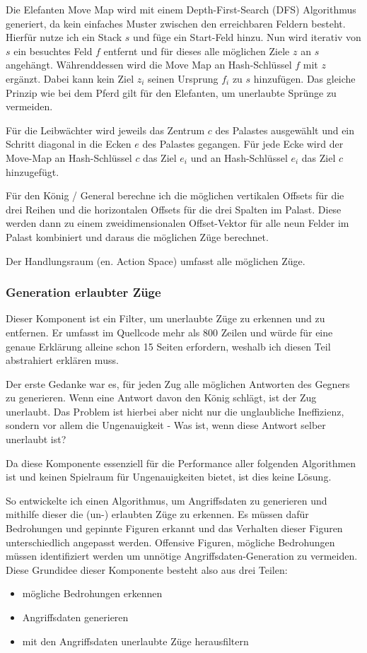 \documentclass{jpp}
\begin{document}
Die Elefanten Move Map wird mit einem Depth-First-Search (DFS) Algorithmus generiert, da kein einfaches Muster zwischen den erreichbaren Feldern besteht. Hierfür nutze ich ein Stack $s$ und füge ein Start-Feld hinzu. Nun wird iterativ von $s$ ein besuchtes Feld $f$ entfernt und für dieses alle möglichen Ziele $z$ an $s$ angehängt. Währenddessen wird die Move Map an Hash-Schlüssel $f$ mit $z$ ergänzt. Dabei kann kein Ziel $z_i$ seinen Ursprung $f_i$ zu $s$ hinzufügen. Das gleiche Prinzip wie bei dem Pferd gilt für den Elefanten, um unerlaubte Sprünge zu vermeiden.

Für die Leibwächter wird jeweils das Zentrum $c$ des Palastes ausgewählt und ein Schritt diagonal in die Ecken $e$ des Palastes gegangen. Für jede Ecke wird der Move-Map an Hash-Schlüssel $c$ das Ziel $e_i$ und an Hash-Schlüssel $e_i$ das Ziel $c$ hinzugefügt.

Für den König / General berechne ich die möglichen vertikalen Offsets für die drei Reihen und die horizontalen Offsets für die drei Spalten im Palast. Diese werden dann zu einem zweidimensionalen Offset-Vektor für alle neun Felder im Palast kombiniert und daraus die möglichen Züge berechnet. 

Der Handlungsraum (en. Action Space) umfasst alle möglichen Züge.

\subsubsection{ Generation erlaubter Züge}
Dieser Komponent ist ein Filter, um unerlaubte Züge zu erkennen und zu entfernen. Er umfasst im Quellcode mehr als 800 Zeilen und würde für eine genaue Erklärung alleine schon 15 Seiten erfordern, weshalb ich diesen Teil abstrahiert erklären muss.

Der erste Gedanke war es, für jeden Zug alle möglichen Antworten des Gegners zu generieren. Wenn eine Antwort davon den König schlägt, ist der Zug unerlaubt. Das Problem ist hierbei aber nicht nur die unglaubliche Ineffizienz, sondern vor allem die Ungenauigkeit - Was ist, wenn diese Antwort selber unerlaubt ist? 

Da diese Komponente essenziell für die Performance aller folgenden Algorithmen ist und keinen Spielraum für Ungenauigkeiten bietet, ist dies keine Lösung.

So entwickelte ich einen Algorithmus, um Angriffsdaten zu generieren und mithilfe dieser die (un-) erlaubten Züge zu erkennen.
Es müssen dafür Bedrohungen und gepinnte Figuren erkannt und das Verhalten dieser Figuren unterschiedlich angepasst werden. Offensive Figuren, mögliche Bedrohungen müssen identifiziert werden um unnötige Angriffsdaten-Generation zu vermeiden.
Diese Grundidee dieser Komponente besteht also aus drei Teilen:
\begin{itemize}
    \item mögliche Bedrohungen erkennen
    \item Angriffsdaten generieren
    \item mit den Angriffsdaten unerlaubte Züge herausfiltern
\end{itemize}
\end{document}
